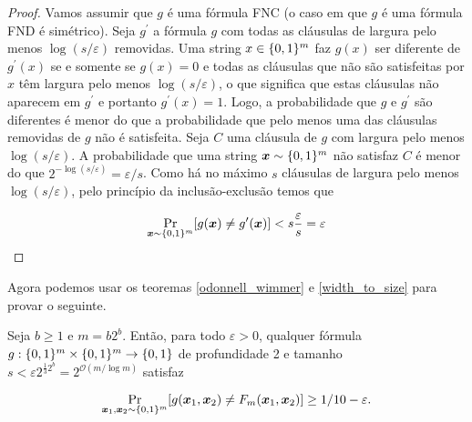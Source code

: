 \begin{proof}

Vamos assumir que $g$ é uma fórmula FNC (o caso em que $g$ é uma fórmula FND é simétrico). Seja $g^{\prime}$ a fórmula $g$ com todas as cláusulas de largura pelo menos $\log(s/\varepsilon)$ removidas. Uma string $x \in \{0, 1\}^{m}$ faz $g(x)$ ser diferente de $g^{\prime}(x)$ se e somente se $g(x) = 0$ e todas as cláusulas que não são satisfeitas por $x$ têm largura pelo menos $\log(s/\varepsilon)$, o que significa que estas cláusulas não aparecem em $g^{\prime}$ e portanto $g^{\prime}(x) = 1$. Logo, a probabilidade que $g$ e $g^{\prime}$ são diferentes é menor do que a probabilidade que pelo menos uma das cláusulas removidas de $g$ não é satisfeita. Seja $C$ uma cláusula de $g$ com largura pelo menos $\log(s/\varepsilon)$. A probabilidade que uma string $\boldsymbol{x} \sim \{0, 1\}^{m}$ não satisfaz $C$ é menor do que $2^{-\log(s/\varepsilon)} = \varepsilon/s$. Como há no máximo $s$ cláusulas de largura pelo menos $\log(s/\varepsilon)$, pelo princípio da inclusão-exclusão temos que

\begin{equation*}
    \Pr_{\boldsymbol{x} \sim \{0, 1\}^{m}}[g(\boldsymbol{x}) \neq g^{\prime}(\boldsymbol{x})] < s\frac{\varepsilon}{s} = \varepsilon
\end{equation*}

\end{proof}

Agora podemos usar os teoremas \ref{odonnell_wimmer} e \ref{width_to_size} para provar o seguinte.

\begin{teo}  \label{odonnel_wimmer_size}

Seja $b \geq 1$ e $m = b2^{b}$. Então, para todo $\varepsilon > 0$,  qualquer fórmula $g: \{0, 1\}^{m} \times \{0, 1\}^{m} \to \{0, 1\}$ de profundidade 2 e tamanho $s < \varepsilon2^{\frac{1}{3}2^{b}} = 2^{\mathcal{O}(m/\log m)}$ satisfaz

\begin{equation*}
    \Pr_{\boldsymbol{x}_{1}, \boldsymbol{x}_{2} \sim \{0, 1\}^{m}}[g(\boldsymbol{x}_{1}, \boldsymbol{x}_{2}) \neq F_{m}(\boldsymbol{x}_{1}, \boldsymbol{x}_{2})] \geq 1/10 - \varepsilon.
\end{equation*}

\end{teo}

